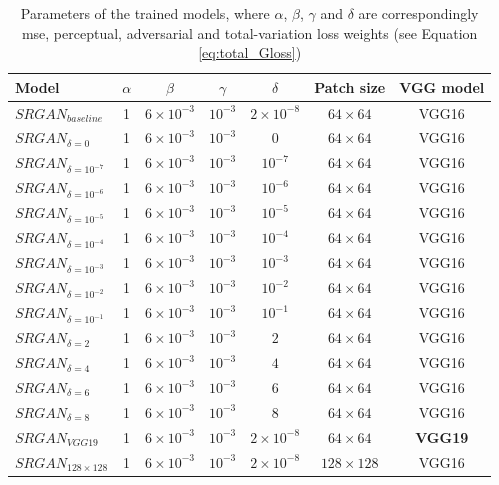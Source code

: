 \documentclass[conference]{IEEEtran}
\begin{document}
\begin{table}[htb]
	\centering
	\caption{Parameters of the trained models, where $\alpha$, $\beta$, $\gamma$ and $\delta$ are correspondingly \acrshort{mse}, perceptual, adversarial and total-variation loss weights (see Equation \ref{eq:total_Gloss})}
	\label{tab:model_parameters}
	\begin{tabular}{|l|c|c|c|c|c|c|}
	\hline
	Model                    & $\alpha$ & $\beta$            & $\gamma$  & $\delta$           & Patch size       & VGG model      \\ \hline
	$SRGAN_{baseline}$       & 1        & $6 \times 10^{-3}$ & $10^{-3}$ & $2 \times 10^{-8}$ & $64 \times 64$   & VGG16          \\ \hline
	$SRGAN_{\delta=0}$       & 1        & $6 \times 10^{-3}$ & $10^{-3}$ & $0$                & $64 \times 64$   & VGG16          \\ \hline
	$SRGAN_{\delta=10^{-7}}$ & 1        & $6 \times 10^{-3}$ & $10^{-3}$ & $10^{-7}$          & $64 \times 64$   & VGG16          \\ \hline
	$SRGAN_{\delta=10^{-6}}$ & 1        & $6 \times 10^{-3}$ & $10^{-3}$ & $10^{-6}$          & $64 \times 64$   & VGG16          \\ \hline
	$SRGAN_{\delta=10^{-5}}$ & 1        & $6 \times 10^{-3}$ & $10^{-3}$ & $10^{-5}$          & $64 \times 64$   & VGG16          \\ \hline
	$SRGAN_{\delta=10^{-4}}$ & 1        & $6 \times 10^{-3}$ & $10^{-3}$ & $10^{-4}$          & $64 \times 64$   & VGG16          \\ \hline
	$SRGAN_{\delta=10^{-3}}$ & 1        & $6 \times 10^{-3}$ & $10^{-3}$ & $10^{-3}$          & $64 \times 64$   & VGG16          \\ \hline
	$SRGAN_{\delta=10^{-2}}$ & 1        & $6 \times 10^{-3}$ & $10^{-3}$ & $10^{-2}$          & $64 \times 64$   & VGG16          \\ \hline
	$SRGAN_{\delta=10^{-1}}$ & 1        & $6 \times 10^{-3}$ & $10^{-3}$ & $10^{-1}$          & $64 \times 64$   & VGG16          \\ \hline
	$SRGAN_{\delta=2}$       & 1        & $6 \times 10^{-3}$ & $10^{-3}$ & $2$                & $64 \times 64$   & VGG16          \\ \hline
	$SRGAN_{\delta=4}$       & 1        & $6 \times 10^{-3}$ & $10^{-3}$ & $4$                & $64 \times 64$   & VGG16          \\ \hline
	$SRGAN_{\delta=6}$       & 1        & $6 \times 10^{-3}$ & $10^{-3}$ & $6$                & $64 \times 64$   & VGG16          \\ \hline
	$SRGAN_{\delta=8}$       & 1        & $6 \times 10^{-3}$ & $10^{-3}$ & $8$                & $64 \times 64$   & VGG16          \\ \hline
	$SRGAN_{VGG19}$          & 1        & $6 \times 10^{-3}$ & $10^{-3}$ & $2 \times 10^{-8}$ & $64 \times 64$   & \textbf{VGG19} \\ \hline
	$SRGAN_{128 \times 128}$ & 1        & $6 \times 10^{-3}$ & $10^{-3}$ & $2 \times 10^{-8}$ & $128 \times 128$ & VGG16          \\ \hline
\end{tabular}
\end{table}
\end{document}
